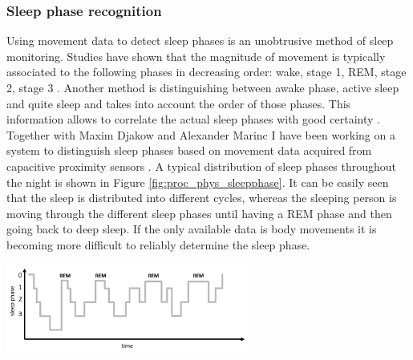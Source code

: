 \subsubsection{Sleep phase recognition}
Using movement data to detect sleep phases is an unobtrusive method of sleep monitoring. Studies have shown that the magnitude of movement is typically associated to the following phases in decreasing order: wake, stage 1, REM, stage 2, stage 3 \cite{wilde1983movement}. Another method is distinguishing between awake phase, active sleep and quite sleep and takes into account the order of those phases. This information allows to correlate the actual sleep phases with good certainty \cite{salmi86}. Together with Maxim Djakow and Alexander Marinc I have been working on a system to distinguish sleep phases based on movement data acquired from capacitive proximity sensors \cite{Djakow2013movibed}. 
A typical distribution of sleep phases throughout the night is shown in Figure \ref{fig:proc_phys_sleepphase}. It can be easily seen that the sleep is distributed into different cycles, whereas the sleeping person is moving through the different sleep phases until having a REM phase and then going back to deep sleep. If the only available data is body movements it is becoming more difficult to reliably determine the sleep phase.

\begin{minipage}{\linewidth}
\centering
\includegraphics[width=0.6\textwidth]{images/proc_phys_sleepphase}
\label{fig:proc_phys_sleepphase}
\end{minipage}

